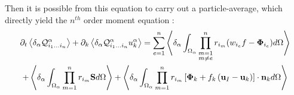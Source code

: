 Then it is possible from this equation to carry out a particle-average, which directly yield the $n^{th}$ order moment equation : 
\begin{multline*}
    \partial_t \left<\delta_\alpha \mathcal{Q}_{i_1\ldots i_n}^\alpha\right>
    + \partial_k  \left<\delta_\alpha \mathcal{Q}_{i_1\ldots i_n}^\alpha u_k^\alpha\right>
    = \sum_{e=1}^{n} \left<\delta_\alpha \int_{\Omega_\alpha} \prod^{n}_{\substack{ m=1 \\   m \neq e}} r_{i_m} (w_{i_e}f  - \mathbf{\Phi}_{i_e})d\Omega\right>\\
    + \left<\delta_\alpha \int_{\Omega_\alpha} \prod_{m=1}^{n} r_{i_m} \textbf{S} d\Omega\right>
    + \left<\delta_\alpha \int_{\Omega_\alpha} \prod_{m=1}^{n} r_{i_m} \left[
            \mathbf{\Phi}_k
            + f_k
            \left(
                \textbf{u}_I
                - \textbf{u}_k
            \right)
        \right]
        \cdot \textbf{n}_kd\Omega\right>
\end{multline*}

